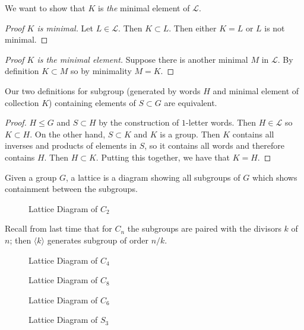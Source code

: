 We want to show that $K$ is \emph{the} minimal element of $\mathcal{L}$.

\begin{proof}[Proof $K$ is minimal]
Let $L \in \mathcal{L}$. Then $K \subset L$. Then either $K = L$ or $L$ is not minimal.
\end{proof}

\begin{proof}[Proof $K$ is \emph{the} minimal element]
Suppose there is another minimal $M$ in $\mathcal{L}$. By definition $K \subset M$ so by minimality $M = K$.
\end{proof}

\begin{proposition}
Our two definitions for subgroup (generated by words $H$ and minimal element of collection $K$) containing elements of $S \subset G$ are equivalent.
\end{proposition}

\begin{proof}
$H \leq G$ and $S \subset H$ by the construction of $1$-letter words. Then $H \in \mathcal{L}$ so $K \subset H$. On the other hand, $S \subset K$ and $K$ is a group. Then $K$ contains all inverses and products of elements in $S$, so it contains all words and therefore contains $H$. Then $H \subset K$. Putting this together, we have that $K = H$.
\end{proof}

\begin{definition}[Lattice]
Given a group $G$, a lattice is a diagram showing all subgroups of $G$ which shows containment between the subgroups.
\end{definition}

\begin{figure}[h]
	\caption{Lattice Diagram of $C_2$}
\end{figure}

Recall from last time that for $C_n$ the subgroups are paired with the divisors $k$ of $n$; then $\langle k \rangle$ generates subgroup of order $n / k$.

\begin{figure}[h]
	\caption{Lattice Diagram of $C_4$}
\end{figure}

\begin{figure}[h]
	\caption{Lattice Diagram of $C_8$}
\end{figure}

\begin{figure}[h]
	\caption{Lattice Diagram of $C_6$}
\end{figure}

\begin{figure}[h]
	\caption{Lattice Diagram of $S_3$}
\end{figure}